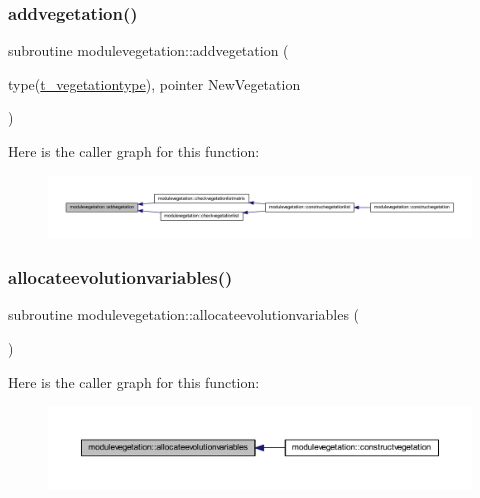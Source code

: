 \subsubsection{\texorpdfstring{addvegetation()}{addvegetation()}}
{\footnotesize\ttfamily subroutine modulevegetation\+::addvegetation (\begin{DoxyParamCaption}\item[{type(\mbox{\hyperlink{structmodulevegetation_1_1t__vegetationtype}{t\+\_\+vegetationtype}}), pointer}]{New\+Vegetation }\end{DoxyParamCaption})\hspace{0.3cm}{\ttfamily [private]}}

Here is the caller graph for this function\+:\nopagebreak
\begin{figure}[H]
\begin{center}
\leavevmode
\includegraphics[width=350pt]{namespacemodulevegetation_ad22b2fa6cec4ffe4f2464f02624beca6_icgraph}
\end{center}
\end{figure}
\mbox{\label{namespacemodulevegetation_a1a48067359829dcfe9c8335991ba78cc}} 
\subsubsection{\texorpdfstring{allocateevolutionvariables()}{allocateevolutionvariables()}}
{\footnotesize\ttfamily subroutine modulevegetation\+::allocateevolutionvariables (\begin{DoxyParamCaption}{ }\end{DoxyParamCaption})\hspace{0.3cm}{\ttfamily [private]}}

Here is the caller graph for this function\+:\nopagebreak
\begin{figure}[H]
\begin{center}
\leavevmode
\includegraphics[width=350pt]{namespacemodulevegetation_a1a48067359829dcfe9c8335991ba78cc_icgraph}
\end{center}
\end{figure}
\mbox{\label{namespacemodulevegetation_a1f6f35f8c49c08345fa70db3965f5763}} 

